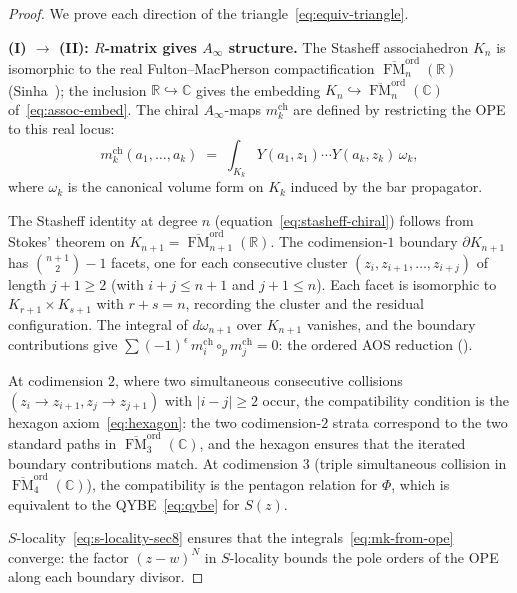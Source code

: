 \documentclass[11pt,reqno]{amsart}
\theoremstyle{definition}
\theoremstyle{remark}
\newcommand{\Ainf}{A_{\infty}}
\DeclareMathOperator{\FM}{FM}
\newcommand{\CC}{\mathbb{C}}
\newcommand{\RR}{\mathbb{R}}
\numberwithin{equation}{section}
\begin{document}
\begin{proof}
We prove each direction of the
triangle~\eqref{eq:equiv-triangle}.

\medskip
\noindent
\textbf{(I) $\boldsymbol{\to}$ (II): $R$-matrix gives
$\Ainf$ structure.}
The Stasheff associahedron $K_n$ is isomorphic to the
real Fulton--MacPherson compactification
$\overline{\FM}_n^{\mathrm{ord}}(\RR)$
(Sinha~\cite{Sinha04}); the inclusion
$\RR \hookrightarrow \CC$ gives the embedding
$K_n \hookrightarrow \overline{\FM}_n^{\mathrm{ord}}(\CC)$
of~\eqref{eq:assoc-embed}.
The chiral $\Ainf$-maps $m_k^{\mathrm{ch}}$ are defined by
restricting the OPE to this real locus:
\begin{equation}\label{eq:mk-from-ope}
  m_k^{\mathrm{ch}}(a_1, \ldots, a_k)
  \;=\;
  \int_{K_k}
  Y(a_1, z_1) \cdots Y(a_k, z_k)\, \omega_k,
\end{equation}
where $\omega_k$ is the canonical volume form on $K_k$
induced by the bar propagator.

The Stasheff identity at degree $n$
(equation~\eqref{eq:stasheff-chiral}) follows from Stokes'
theorem on $K_{n+1}
= \overline{\FM}_{n+1}^{\mathrm{ord}}(\RR)$.
The codimension-$1$ boundary $\partial K_{n+1}$ has
$\binom{n+1}{2} - 1$ facets, one for each consecutive
cluster $(z_i, z_{i+1}, \ldots, z_{i+j})$ of length
$j + 1 \geq 2$ (with $i + j \leq n + 1$ and
$j + 1 \leq n$). Each facet is
isomorphic to $K_{r+1} \times K_{s+1}$ with $r + s = n$,
recording the cluster and the residual configuration.
The integral of $d\omega_{n+1}$ over $K_{n+1}$ vanishes,
and the boundary contributions give
$\sum (-1)^{\epsilon}\, m_i^{\mathrm{ch}} \circ_p
m_j^{\mathrm{ch}} = 0$: the ordered AOS reduction
(\cite[\S5]{Lorgat26I}).

At codimension $2$, where two simultaneous consecutive
collisions $(z_i \to z_{i+1}, z_j \to z_{j+1})$ with
$|i - j| \geq 2$ occur, the compatibility condition
is the hexagon axiom~\eqref{eq:hexagon}: the two
codimension-$2$ strata correspond to the two standard
paths in $\overline{\FM}_3^{\mathrm{ord}}(\CC)$, and
the hexagon ensures that the iterated boundary
contributions match. At codimension $3$ (triple
simultaneous collision in
$\overline{\FM}_4^{\mathrm{ord}}(\CC)$), the
compatibility is the pentagon relation for $\Phi$, which
is equivalent to the QYBE~\eqref{eq:qybe} for $S(z)$.

$S$-locality~\eqref{eq:s-locality-sec8} ensures that the
integrals~\eqref{eq:mk-from-ope} converge: the factor
$(z - w)^N$ in $S$-locality bounds the pole orders
of the OPE along each boundary divisor.


\end{proof}
\end{document}
